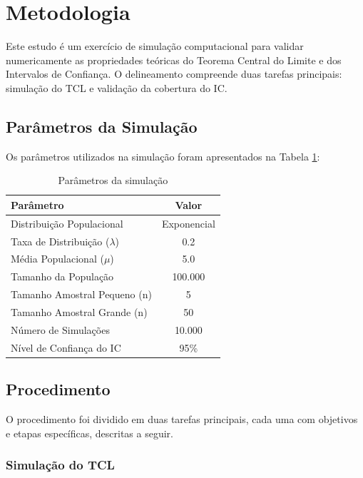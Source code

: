 \documentclass[12pt,a4paper]{article}
\begin{document}
\section{Metodologia}

Este estudo é um exercício de simulação computacional para validar numericamente as propriedades teóricas do Teorema Central do Limite e dos Intervalos de Confiança. O delineamento compreende duas tarefas principais: simulação do TCL e validação da cobertura do IC.

\subsection{Parâmetros da Simulação}

Os parâmetros utilizados na simulação foram apresentados na Tabela \ref{tab:parametros}:

\begin{table}[H]
\centering
\begin{tabular}{lc}
\toprule
\textbf{Parâmetro} & \textbf{Valor} \\
\midrule
Distribuição Populacional & Exponencial \\
Taxa de Distribuição ($\lambda$) & 0.2 \\
Média Populacional ($\mu$) & 5.0 \\
Tamanho da População & 100.000 \\
Tamanho Amostral Pequeno (n) & 5 \\
Tamanho Amostral Grande (n) & 50 \\
Número de Simulações & 10.000 \\
Nível de Confiança do IC & 95\% \\
\bottomrule
\end{tabular}
\caption{Parâmetros da simulação}
\label{tab:parametros}
\end{table}

\subsection{Procedimento}

O procedimento foi dividido em duas tarefas principais, cada uma com objetivos e etapas específicas, descritas a seguir.

\subsubsection{Simulação do TCL}
\end{document}
